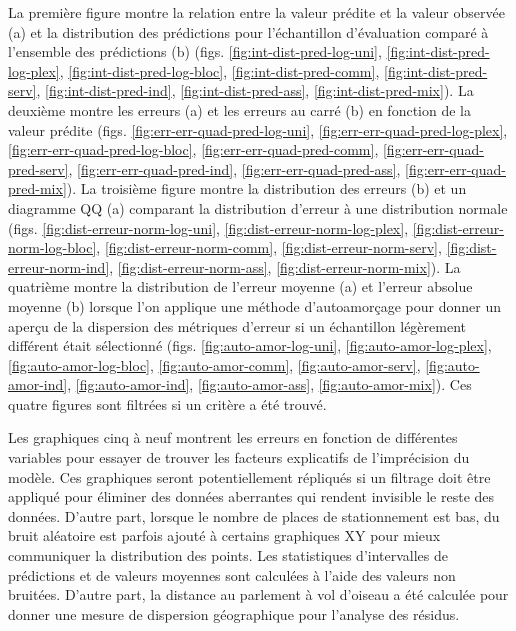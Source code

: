 La première figure  montre la relation entre la valeur prédite et la valeur observée (a) et la distribution des prédictions pour l'échantillon d'évaluation comparé à l'ensemble des prédictions (b) (figs. \ref{fig:int-dist-pred-log-uni}, \ref{fig:int-dist-pred-log-plex}, \ref{fig:int-dist-pred-log-bloc}, \ref{fig:int-dist-pred-comm}, \ref{fig:int-dist-pred-serv}, \ref{fig:int-dist-pred-ind}, \ref{fig:int-dist-pred-ass}, \ref{fig:int-dist-pred-mix}). La deuxième montre les erreurs (a) et les erreurs au carré (b) en fonction de la valeur prédite (figs. \ref{fig:err-err-quad-pred-log-uni}, \ref{fig:err-err-quad-pred-log-plex}, \ref{fig:err-err-quad-pred-log-bloc}, \ref{fig:err-err-quad-pred-comm}, \ref{fig:err-err-quad-pred-serv}, \ref{fig:err-err-quad-pred-ind}, \ref{fig:err-err-quad-pred-ass}, \ref{fig:err-err-quad-pred-mix}). La troisième figure montre la distribution des erreurs (b) et un diagramme QQ (a) comparant la distribution d'erreur à une distribution normale (figs. \ref{fig:dist-erreur-norm-log-uni}, \ref{fig:dist-erreur-norm-log-plex}, \ref{fig:dist-erreur-norm-log-bloc}, \ref{fig:dist-erreur-norm-comm}, \ref{fig:dist-erreur-norm-serv}, \ref{fig:dist-erreur-norm-ind}, \ref{fig:dist-erreur-norm-ass}, \ref{fig:dist-erreur-norm-mix}). La quatrième montre la distribution de l'erreur moyenne (a) et l'erreur absolue moyenne (b) lorsque l'on applique une méthode d'autoamorçage pour donner un aperçu de la dispersion des métriques d'erreur si un échantillon légèrement différent était sélectionné (figs. \ref{fig:auto-amor-log-uni}, \ref{fig:auto-amor-log-plex}, \ref{fig:auto-amor-log-bloc}, \ref{fig:auto-amor-comm}, \ref{fig:auto-amor-serv}, \ref{fig:auto-amor-ind}, \ref{fig:auto-amor-ind}, \ref{fig:auto-amor-ass}, \ref{fig:auto-amor-mix}). Ces quatre figures sont filtrées si un critère a été trouvé. \par
Les graphiques cinq à neuf montrent les erreurs en fonction de différentes variables pour essayer de trouver les facteurs explicatifs de l'imprécision du modèle. Ces graphiques seront potentiellement répliqués si un filtrage doit être appliqué pour éliminer des données aberrantes qui rendent invisible le reste des données. D'autre part, lorsque le nombre de places de stationnement est bas, du bruit aléatoire est parfois ajouté à certains graphiques XY pour mieux communiquer la distribution des points. Les statistiques d'intervalles de prédictions et de valeurs moyennes sont calculées à l'aide des valeurs non bruitées. D'autre part, la distance au parlement à vol d'oiseau a été calculée pour donner une mesure de dispersion géographique pour l'analyse des résidus. \par
